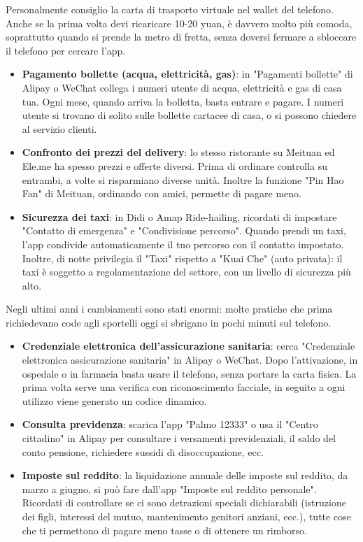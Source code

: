 Personalmente consiglio la carta di trasporto virtuale nel wallet del telefono. Anche se la prima volta devi ricaricare 10-20 yuan, è davvero molto più comoda, soprattutto quando si prende la metro di fretta, senza doversi fermare a sbloccare il telefono per cercare l'app.


\begin{itemize}
  \item \textbf{Pagamento bollette (acqua, elettricità, gas)}: in "Pagamenti bollette" di Alipay o WeChat collega i numeri utente di acqua, elettricità e gas di casa tua. Ogni mese, quando arriva la bolletta, basta entrare e pagare. I numeri utente si trovano di solito sulle bollette cartacee di casa, o si possono chiedere al servizio clienti.
  \item \textbf{Confronto dei prezzi del delivery}: lo stesso ristorante su Meituan ed Ele.me ha spesso prezzi e offerte diversi. Prima di ordinare controlla su entrambi, a volte si risparmiano diverse unità. Inoltre la funzione "Pin Hao Fan" di Meituan, ordinando con amici, permette di pagare meno.
  \item \textbf{Sicurezza dei taxi}: in Didi o Amap Ride-hailing, ricordati di impostare "Contatto di emergenza" e "Condivisione percorso". Quando prendi un taxi, l'app condivide automaticamente il tuo percorso con il contatto impostato. Inoltre, di notte privilegia il "Taxi" rispetto a "Kuai Che" (auto privata): il taxi è soggetto a regolamentazione del settore, con un livello di sicurezza più alto.
\end{itemize}


Negli ultimi anni i cambiamenti sono stati enormi: molte pratiche che prima richiedevano code agli sportelli oggi si sbrigano in pochi minuti sul telefono.

\begin{itemize}
  \item \textbf{Credenziale elettronica dell'assicurazione sanitaria}: cerca "Credenziale elettronica assicurazione sanitaria" in Alipay o WeChat. Dopo l'attivazione, in ospedale o in farmacia basta usare il telefono, senza portare la carta fisica. La prima volta serve una verifica con riconoscimento facciale, in seguito a ogni utilizzo viene generato un codice dinamico.
  \item \textbf{Consulta previdenza}: scarica l'app "Palmo 12333" o usa il "Centro cittadino" in Alipay per consultare i versamenti previdenziali, il saldo del conto pensione, richiedere sussidi di disoccupazione, ecc.
  \item \textbf{Imposte sul reddito}: la liquidazione annuale delle imposte sul reddito, da marzo a giugno, si può fare dall'app "Imposte sul reddito personale". Ricordati di controllare se ci sono detrazioni speciali dichiarabili (istruzione dei figli, interessi del mutuo, mantenimento genitori anziani, ecc.), tutte cose che ti permettono di pagare meno tasse o di ottenere un rimborso.
\end{itemize}


